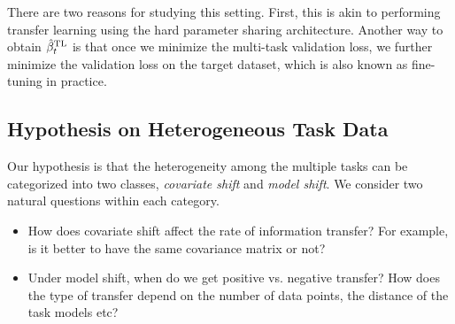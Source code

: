There are two reasons for studying this setting.
First, this is akin to performing transfer learning using the hard parameter sharing architecture.
Another way to obtain $\hat{\beta}_t^{\text{TL}}$ is that once we minimize the multi-task validation loss, we further minimize the validation loss on the target dataset, which is also known as fine-tuning in practice.


\subsection{Hypothesis on Heterogeneous Task Data}

Our hypothesis is that the heterogeneity among the multiple tasks can be categorized into two classes, \textit{covariate shift} and \textit{model shift}. %
We consider two natural questions within each category.
\begin{itemize}
	\item How does covariate shift affect the rate of information transfer?
	For example, is it better to have the same covariance matrix or not?
	\item Under model shift, when do we get positive vs. negative transfer?
	How does the type of transfer depend on the number of data points, the distance of the task models etc?
\end{itemize}



